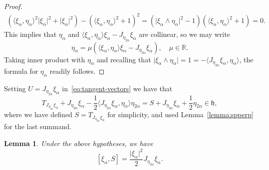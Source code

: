 \documentclass[12pt, a4paper]{amsart}
\newcommand{\g}{\mathfrak}
\newcommand{\R}{\mathbb{R}}
\newtheorem{lemma}[theorem]{Lemma}
\theoremstyle{definition}
\begin{document}
\begin{proof}
\begin{align*}
(\langle\xi_\alpha,\eta_\alpha\rangle^2\lvert\xi_\alpha\rvert^2+\lvert \xi_\alpha\rvert^2)
-(\langle\xi_\alpha,\eta_\alpha\rangle^2+1)^2
=(\lvert\xi_\alpha\wedge\eta_\alpha\rvert^2-1)(\langle\xi_\alpha,\eta_\alpha\rangle^2+1)=0.
\end{align*}
This implies that $\eta_\alpha$ and $\langle\xi_\alpha,\eta_\alpha\rangle\xi_\alpha-J_{\eta_{2\alpha}}\xi_\alpha$ are collinear, so we may write
\begin{equation*}
\eta_\alpha=\mu(\langle\xi_\alpha,\eta_\alpha\rangle\xi_\alpha-J_{\eta_{2\alpha}}\xi_\alpha), \quad \mu\in \R.
\end{equation*}
Taking inner product with $\eta_\alpha$ and recalling that
$\lvert\xi_\alpha\wedge\eta_\alpha\rvert=1=-\langle J_{\eta_{2\alpha}}\xi_\alpha,\eta_\alpha\rangle$,
the formula for $\eta_\alpha$ readily follows.\qedhere
\end{proof}

Setting $U=J_{\eta_{2\alpha}}\xi_\alpha$ in~\eqref{eq:tangent-vectors} we have that
\[
T_{J_{\eta_{2\alpha}}\xi_\alpha}+J_{\eta_{2\alpha}}\xi_\alpha
-\frac{1}{2}\langle J_{\eta_{2\alpha}}\xi_\alpha,\eta_\alpha\rangle\eta_{2\alpha}
=S+J_{\eta_{2\alpha}}\xi_\alpha
+\frac{1}{2}\eta_{2\alpha}\in\g{h},
\]
where we have defined $S=T_{J_{\eta_{2\alpha}}\xi_\alpha}$ for simplicity, and used Lemma~\ref{lemma:spperp} for the last summand.

\begin{lemma}\label{lemma:bracket-xialpha-S}
Under the above hypotheses, we have
\[
[\xi_\alpha,S]=\frac{\lvert\xi_\alpha\rvert^2}{2}J_{\eta_{2\alpha}}\xi_\alpha.
\]
\end{lemma}
\end{document}
